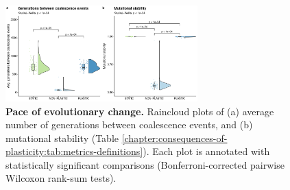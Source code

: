 
\begin{figure}[h!]
    \centering
    \includegraphics[width=0.66\textwidth]{chapters/03-evolutionary-consequences-of-plasticity/media/evolutionary-change-pace-panel.pdf}
    \caption{\small
    \textbf{Pace of evolutionary change.}
    Raincloud plots of 
    (a) average number of generations between coalescence events,
    and (b) mutational stability (Table \ref{chapter:consequences-of-plasticity:tab:metrics-definitions}).
    Each plot is annotated with statistically significant comparisons (Bonferroni-corrected pairwise Wilcoxon rank-sum tests).
    }
    \label{chapter:consequences-of-plasticity:fig:evolutionary-dynamics-rate}
\end{figure}
